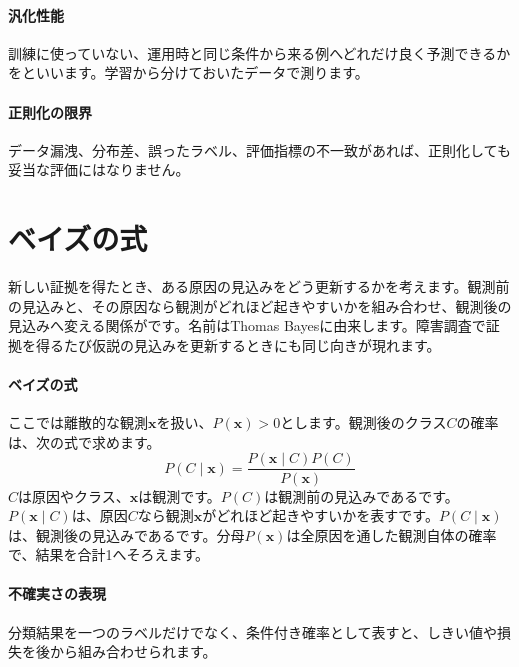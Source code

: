 \par
\endgroup
\medskip
\begingroup
\paragraph{汎化性能}
        訓練に使っていない、運用時と同じ条件から来る例へどれだけ良く予測できるかをといいます。学習から分けておいたデータで測ります。

\paragraph{正則化の限界}
        データ漏洩、分布差、誤ったラベル、評価指標の不一致があれば、正則化しても妥当な評価にはなりません。

\par
\endgroup
\par
\endgroup


\section{ベイズの式}
\label{sec:06-machine-learning-12}

新しい証拠を得たとき、ある原因の見込みをどう更新するかを考えます。観測前の見込みと、その原因なら観測がどれほど起きやすいかを組み合わせ、観測後の見込みへ変える関係がです。名前はThomas Bayesに由来します。障害調査で証拠を得るたび仮説の見込みを更新するときにも同じ向きが現れます。

\begingroup
\begingroup
\paragraph{ベイズの式}
        ここでは離散的な観測$\mathbf{x}$を扱い、$P(\mathbf{x})>0$とします。観測後のクラス$C$の確率は、次の式で求めます。
        \[
          P(C\mid\mathbf{x})=
          \frac{P(\mathbf{x}\mid C)P(C)}
               {P(\mathbf{x})}
        \]
        $C$は原因やクラス、$\mathbf{x}$は観測です。$P(C)$は観測前の見込みであるです。$P(\mathbf{x}\mid C)$は、原因$C$なら観測$\mathbf{x}$がどれほど起きやすいかを表すです。$P(C\mid\mathbf{x})$は、観測後の見込みであるです。分母$P(\mathbf{x})$は全原因を通した観測自体の確率で、結果を合計1へそろえます。

\paragraph{不確実さの表現}
        分類結果を一つのラベルだけでなく、条件付き確率として表すと、しきい値や損失を後から組み合わせられます。

